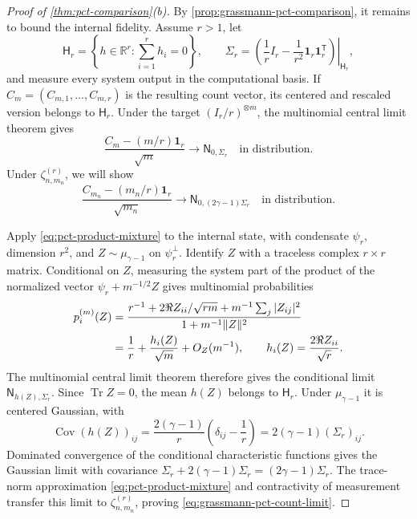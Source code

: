 \documentclass[11pt]{article}
\theoremstyle{remark}
\theoremstyle{plain}
\newcommand{\R}{\mathbb R}
\newcommand{\Tr}{\operatorname{Tr}}
\newcommand{\ot}{\otimes}
\begin{document}
\begin{proof}[Proof of \cref{thm:pct-comparison}\textup{(b)}]
By \cref{prop:grassmann-pct-comparison}, it remains to bound the internal
fidelity.  Assume \(r>1\), let
\[
  \mathsf H_r=\left\{h\in\R^r:\sum_{i=1}^r h_i=0\right\},
  \qquad
  \Sigma_r
  =\left.\left(\frac1r I_r-\frac1{r^2}
    \mathbf1_r\mathbf1_r^{\mathsf T}\right)\right|_{\mathsf H_r},
\]
and measure every system output in the computational basis.  If
\(C_m=(C_{m,1},\ldots,C_{m,r})\) is the resulting count vector, its
centered and rescaled version belongs to \(\mathsf H_r\).
Under the target \((I_r/r)^{\ot m}\), the multinomial central limit theorem
gives
\begin{equation}
  \frac{C_m-(m/r)\mathbf1_r}{\sqrt m}
  \longrightarrow\mathsf N_{0,\Sigma_r}
  \quad\text{in distribution}.
  \label{eq:grassmann-target-count-limit}
\end{equation}
Under \(\zeta_{n,m_n}^{(r)}\), we will show
\begin{equation}
  \frac{C_{m_n}-(m_n/r)\mathbf1_r}{\sqrt{m_n}}
  \longrightarrow
  \mathsf N_{0,(2\gamma-1)\Sigma_r}
  \quad\text{in distribution}.
  \label{eq:grassmann-pct-count-limit}
\end{equation}

Apply \eqref{eq:pct-product-mixture} to the internal state, with
condensate \(\psi_r\), dimension \(r^2\), and
\(Z\sim\mu_{\gamma-1}\) on \(\psi_r^\perp\).  Identify \(Z\) with a
traceless complex \(r\times r\) matrix.  Conditional on \(Z\), measuring
the system part of the product of the normalized vector
\(\psi_r+m^{-1/2}Z\) gives multinomial probabilities
\begin{align}
  p_i^{(m)}(Z)
  &=\frac{r^{-1}+2\Re Z_{ii}/\sqrt{rm}
                +m^{-1}\sum_j|Z_{ij}|^2}
         {1+m^{-1}\|Z\|^2}\notag\\*
  &=\frac1r+\frac{h_i(Z)}{\sqrt m}+O_Z(m^{-1}),
  \qquad h_i(Z)=\frac{2\Re Z_{ii}}{\sqrt r}.
  \label{eq:grassmann-coherent-count-probabilities}
\end{align}
The multinomial central limit theorem therefore gives the conditional
limit \(\mathsf N_{h(Z),\Sigma_r}\).  Since \(\Tr Z=0\), the mean
\(h(Z)\) belongs to \(\mathsf H_r\). Under \(\mu_{\gamma-1}\) it is
centered Gaussian, with
\[
  \operatorname{Cov}(h(Z))_{ij}
  =\frac{2(\gamma-1)}r\left(\delta_{ij}-\frac1r\right)
  =2(\gamma-1)(\Sigma_r)_{ij}.
\]
Dominated convergence of the conditional characteristic functions gives
the Gaussian limit with covariance
\(\Sigma_r+2(\gamma-1)\Sigma_r=(2\gamma-1)\Sigma_r\).
The trace-norm approximation \eqref{eq:pct-product-mixture} and
contractivity of measurement transfer this limit to
\(\zeta_{n,m_n}^{(r)}\), proving
\eqref{eq:grassmann-pct-count-limit}.


\end{proof}
\end{document}
